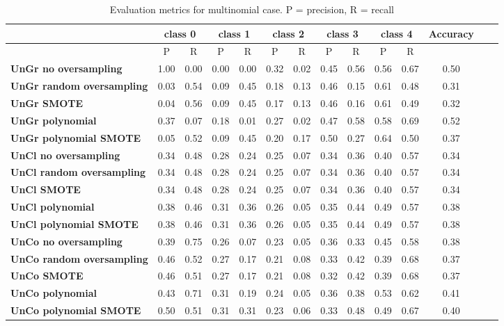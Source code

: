 \documentclass{article}
\begin{document}
\begin{table}[h]
  \centering
  \begin{tabular}{|p{3cm}|c|c|c|c|c|c|c|c|c|c|c|c|c|}
    \hline
     & \multicolumn{2}{|c|}{\textbf{class 0}} & \multicolumn{2}{|c|}{\textbf{class 1}} & \multicolumn{2}{|c|}{\textbf{class 2}} & \multicolumn{2}{|c|}{\textbf{class 3}} & \multicolumn{2}{|c|}{\textbf{class 4}} & \textbf{Accuracy} \\
    \hline
    & P & R & P & R & P & R & P & R & P & R &  \\
    \hline
    \textbf{UnGr no oversampling} & 1.00 & 0.00 & 0.00 & 0.00 & 0.32 & 0.02 & 0.45 & 0.56 & 0.56 & 0.67 & 0.50 \\
    \hline
    \textbf{UnGr random oversampling} & 0.03 & 0.54 & 0.09 & 0.45 & 0.18 & 0.13 & 0.46 & 0.15 & 0.61 & 0.48 & 0.31 \\
    \hline
    \textbf{UnGr SMOTE} & 0.04 & 0.56 & 0.09 & 0.45 & 0.17 & 0.13 & 0.46 & 0.16 & 0.61 & 0.49 & 0.32 \\
    \hline
    \textbf{UnGr polynomial} & 0.37 & 0.07 & 0.18 & 0.01 & 0.27 & 0.02 & 0.47 & 0.58 & 0.58 & 0.69 & 0.52 \\
    \hline
    \textbf{UnGr polynomial SMOTE} & 0.05 & 0.52 & 0.09 & 0.45 & 0.20 & 0.17 & 0.50 & 0.27 & 0.64 & 0.50 & 0.37 \\
    \hline
    \textbf{UnCl no oversampling} & 0.34 & 0.48 & 0.28 & 0.24 & 0.25 & 0.07 & 0.34 & 0.36 & 0.40 & 0.57 & 0.34 \\
    \hline
    \textbf{UnCl random oversampling} & 0.34 & 0.48 & 0.28 & 0.24 & 0.25 & 0.07 & 0.34 & 0.36 & 0.40 & 0.57 & 0.34 \\
    \hline
    \textbf{UnCl SMOTE} & 0.34 & 0.48 & 0.28 & 0.24 & 0.25 & 0.07 & 0.34 & 0.36 & 0.40 & 0.57 & 0.34 \\
    \hline
    \textbf{UnCl polynomial} & 0.38 & 0.46 & 0.31 & 0.36 & 0.26 & 0.05 & 0.35 & 0.44 & 0.49 & 0.57 & 0.38 \\
    \hline
    \textbf{UnCl polynomial SMOTE} & 0.38 & 0.46 & 0.31 & 0.36 & 0.26 & 0.05 & 0.35 & 0.44 & 0.49 & 0.57 & 0.38 \\
    \hline
    \textbf{UnCo no oversampling} & 0.39 & 0.75 & 0.26 & 0.07 & 0.23 & 0.05 & 0.36 & 0.33 & 0.45 & 0.58 & 0.38 \\
    \hline
    \textbf{UnCo random oversampling} & 0.46 & 0.52 & 0.27 & 0.17 & 0.21 & 0.08 & 0.33 & 0.42 & 0.39 & 0.68 & 0.37 \\
    \hline
    \textbf{UnCo SMOTE} & 0.46 & 0.51 & 0.27 & 0.17 & 0.21 & 0.08 & 0.32 & 0.42 & 0.39 & 0.68 & 0.37 \\
    \hline
    \textbf{UnCo polynomial} & 0.43 & 0.71 & 0.31 & 0.19 & 0.24 & 0.05 & 0.36 & 0.38 & 0.53 & 0.62 & 0.41 \\
    \hline
    \textbf{UnCo polynomial SMOTE} & 0.50 & 0.51 & 0.31 & 0.31 & 0.23 & 0.06 & 0.33 & 0.48 & 0.49 & 0.67 & 0.40 \\
    \hline
  \end{tabular}
  \caption{Evaluation metrics for multinomial case. P = precision, R = recall}
  \label{tab:EvMetMultireg}
\end{table}
\end{document}
